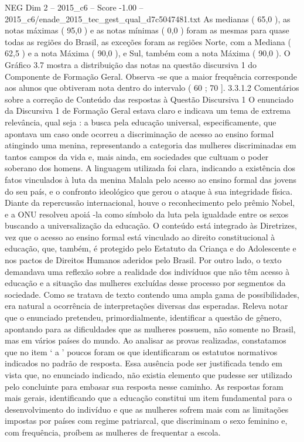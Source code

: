 \begin{textsample}{NEG Dim 2 – 2015\_c6 – Score -1.00 – 2015\_c6/enade\_2015\_tec\_gest\_qual\_d7c5047481.txt}
As medianas ( 65,0 ), as notas máximas ( 95,0 ) e as notas mínimas ( 0,0 ) foram as mesmas para quase todas as regiões do Brasil, as exceções foram as regiões Norte, com a Mediana ( 62,5 ) e a nota Máxima ( 90,0 ), e Sul, também com a nota Máxima ( 90,0 ).
O Gráfico 3.7 mostra a distribuição das notas na questão discursiva 1 do Componente de Formação Geral.
Observa -se que a maior frequência corresponde aos alunos que obtiveram nota dentro do intervalo ( 60 ; 70 ]. 3.3.1.2 Comentários sobre a correção de Conteúdo das respostas à Questão Discursiva 1 O enunciado da Discursiva 1 de Formação Geral estava claro e indicava um tema de extrema relevância, qual seja : a busca pela educação universal, especificamente, que apontava um caso onde ocorreu a discriminação de acesso ao ensino formal atingindo uma menina, representando a categoria das mulheres discriminadas em tantos campos da vida e, mais ainda, em sociedades que cultuam o poder soberano dos homens.
A linguagem utilizada foi clara, indicando a existência dos fatos vinculados à luta da menina Malala pelo acesso ao ensino formal das jovens do seu país, e o confronto ideológico que gerou o ataque à sua integridade física.
Diante da repercussão internacional, houve o reconhecimento pelo prêmio Nobel, e a ONU resolveu apoiá -la como símbolo da luta pela igualdade entre os sexos buscando a universalização da educação.
O conteúdo está integrado às Diretrizes, vez que o acesso ao ensino formal está vinculado ao direito constitucional à educação, que, também, é protegido pelo Estatuto da Criança e do Adolescente e nos pactos de Direitos Humanos aderidos pelo Brasil.
Por outro lado, o texto demandava uma reflexão sobre a realidade dos indivíduos que não têm acesso à educação e a situação das mulheres excluídas desse processo por segmentos da sociedade.
Como se tratava de texto contendo uma ampla gama de possibilidades, era natural a ocorrência de interpretações diversas das esperadas.
Releva notar que o enunciado pretendeu, primordialmente, identificar a questão de gênero, apontando para as dificuldades que as mulheres possuem, não somente no Brasil, mas em vários países do mundo.
Ao analisar as provas realizadas, constatamos que no item ‘ a ’ poucos foram os que identificaram os estatutos normativos indicados no padrão de resposta.
Essa ausência pode ser justificada tendo em vista que, no enunciado indicado, não existia elemento que pudesse ser utilizado pelo concluinte para embasar sua resposta nesse caminho.
As respostas foram mais gerais, identificando que a educação constitui um item fundamental para o desenvolvimento do indivíduo e que as mulheres sofrem mais com as limitações impostas por países com regime patriarcal, que discriminam o sexo feminino e, com frequência, proíbem as mulheres de frequentar a escola.

\end{textsample}
